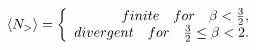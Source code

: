 \begin{equation}
\langle N_> \rangle = \left\{ \begin{array}{r@{\quad \quad}l}
finite\quad for\quad \beta < \frac{3}{2}, \\divergent\quad for\quad 
\frac{3}{2} \le \beta < 2.  \end{array} \right.
\end{equation}

